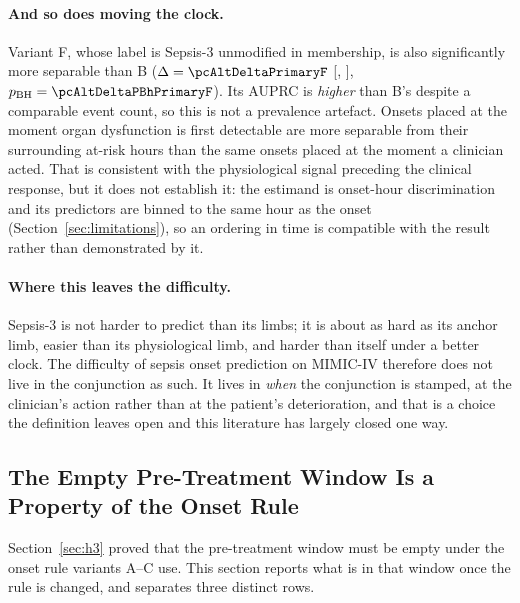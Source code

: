 \paragraph{And so does moving the clock.}
Variant F, whose label is Sepsis-3 unmodified in membership, is also
significantly more separable than B ($\Delta = \pcAltDeltaPrimaryF$
[\pcAltDeltaCiLoPrimaryF, \pcAltDeltaCiHiPrimaryF],
$p_{\text{BH}} = \pcAltDeltaPBhPrimaryF$). Its AUPRC is \emph{higher} than B's
despite a comparable event count, so this is not a prevalence artefact. Onsets
placed at the moment organ dysfunction is first detectable are more separable
from their surrounding at-risk hours than the same onsets placed at the moment
a clinician acted. That is consistent with the physiological signal preceding
the clinical response, but it does not establish it: the estimand is
onset-hour discrimination and its predictors are binned to the same hour as the
onset (Section~\ref{sec:limitations}), so an ordering in time is compatible
with the result rather than demonstrated by it.

\paragraph{Where this leaves the difficulty.}
Sepsis-3 is not harder to predict than its limbs; it is about as hard as its
anchor limb, easier than its physiological limb, and harder than itself under a
better clock. The difficulty of sepsis onset prediction on MIMIC-IV therefore
does not live in the conjunction as such. It lives in \emph{when} the
conjunction is stamped, at the clinician's action rather than at the
patient's deterioration, and that is a choice the definition leaves open and
this literature has largely closed one way.

\subsection{The Empty Pre-Treatment Window Is a Property of the Onset Rule}
\label{sec:pretreatment_label}

Section~\ref{sec:h3} proved that the pre-treatment window must be empty under
the onset rule variants A--C use. This section reports what is in that window
once the rule is changed, and separates three distinct rows.


